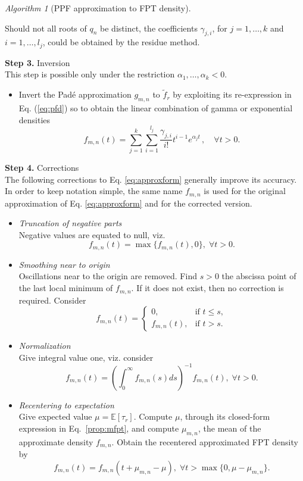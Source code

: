 \documentclass[preprint,12pt]{elsarticle}
\numberwithin{equation}{section}
\theoremstyle{plain} \newtheorem{theorem}{Theorem}[section]
\theoremstyle{plain} \newtheorem{proposition}[theorem]{Proposition}
\theoremstyle{plain} \newtheorem{lemma}[theorem]{Lemma}
\theoremstyle{plain} \newtheorem{corollary}[theorem]{Corollary}
\theoremstyle{definition} \newtheorem{definition}[theorem]{Definition}
\theoremstyle{definition} \newtheorem{notation}[theorem]{Notation}
\theoremstyle{remark} \newtheorem{remark}[theorem]{Remark}
\theoremstyle{remark} \newtheorem{remarks}[theorem]{Remarks}
\theoremstyle{remark} \newtheorem{algorithm2}[theorem]{Algorithm}
\theoremstyle{remark} \newtheorem{example}[theorem]{Example}
\begin{document}
\begin{algorithm2}[PPF approximation to FPT density]
\begin{itemize}
Should not all roots of $q_n$ be distinct, the coefficients $\gamma_{j,i}$, for $j = 1, \dots, k$ 
and $i = 1, \dots, l_j$, could be obtained by 
the residue method.
\end{itemize}
\noindent \textbf{Step 3.} Inversion \\
This step is possible only under the restriction $\alpha_1,\ldots,\alpha_k<0$. 

\begin{itemize}
\item Invert the Pad\'e approximation 
$g_{m,n}$ to $\tilde{f}_r$ by exploiting its re-expression in Eq. (\ref{eq:pfd}) so to obtain the linear combination of gamma or
exponential densities
\begin{equation} \label{eq:approxform}
    f_{m,n}(t)=\sum_{j=1}^k \sum_{i=1}^{l_j} \frac{\gamma_{j,i}}{i!} t^{i-1} e^{\alpha_j t}\,,\quad \forall t> 0.
\end{equation}
\end{itemize}
\noindent \textbf{Step 4.} Corrections \\
The following corrections to Eq.
\eqref{eq:approxform} generally improve its accuracy. 
In order to keep notation simple, the same name $f_{m,n}$ is
used for the original approximation of Eq.
\eqref{eq:approxform}
and for the corrected version.
\begin{itemize}
\item {\it Truncation of negative parts}\\
Negative values are equated to null, viz.
$$f_{m,n}(t) = \max \{f_{m,n}(t), 0\}, \; \forall t >0.$$
\item {\it Smoothing near to origin} \\
Oscillations near to the origin are removed.
Find $s>0$ the abscissa point of the last local minimum of $f_{m,n}$.
If it does not exist, then no correction is required.
Consider 
\begin{equation}                                \label{cat}
f_{m,n}(t) = 
\begin{cases}
    0,          & \text{if } t \le s, \\
    f_{m,n}(t), & \text{if } t>s.
\end{cases}
\end{equation} 
\item {\it Normalization} \\
Give integral value one, viz.
consider $$
f_{m,n}(t) = 
\left( \int_0^\infty f_{m,n}(s) ds \right)^{-1} f_{m,n}(t), \; \forall t >0.$$
\item {\it Recentering to expectation} \\
Give expected value $\mu = \mathbb{E} [\tau_r]$.  Compute $\mu$,
through its closed-form expression
in Eq.~\eqref{prop:mfpt}, and compute $\mu_{m,n}$, 
the mean of the approximate density $f_{m,n}$. Obtain
    the recentered approximated FPT density by 
    $$f_{m,n}(t) = f_{m,n}(t + \mu_{m,n} - \mu), \; \forall t > 
     \max\{0,\mu - \mu_{m,n}\}.
    $$
\end{itemize}
\end{algorithm2}
\end{document}
